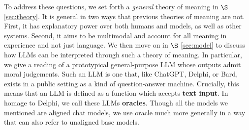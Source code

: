 To address these questions, we set forth a \textit{general} theory of meaning in $\S$ \ref{sec:theory}.
It is general in two ways that previous theories of meaning are not.
First, it has explanatory power over both humans and models, as well as other systems.
Second, it aims to be multimodal and account for all meaning in experience and not just language.
We then move on in $\S$ \ref{sec:model} to discuss how LLMs can be interpreted through such a theory of meaning. 
In particular, we give a reading of a prototypical general-purpose LLM whose outputs admit moral judgements. Such an LLM is one that, like ChatGPT, Delphi, or Bard, exists in a public setting as a kind of question-answer machine. Crucially, this means that an LLM is defined as a function which accepts \textbf{text input}. In homage to Delphi, we call these LLMs \textbf{oracles}. Though all the models we mentioned are aligned chat models, we use oracle much more generally in a way that can also refer to unaligned base models.

